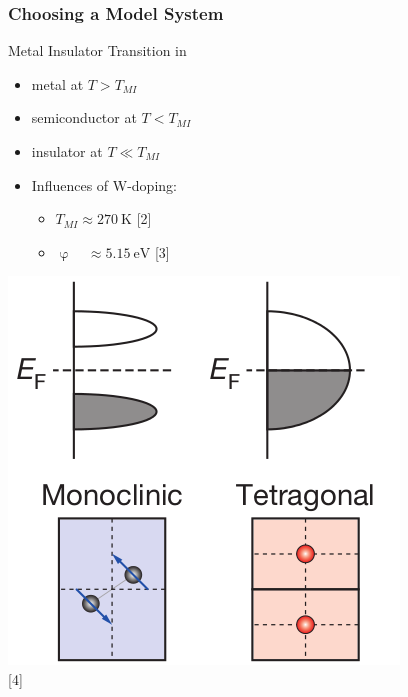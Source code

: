 \documentclass{beamer}
\begin{document}
\begin{frame}
\frametitle{Choosing a Model System}
\begin{block}{Metal Insulator Transition in \vadiox{}}
\begin{minipage}{0.5\linewidth}
	\begin{itemize}
		\item metal at $T>T_{MI}$
		\item semiconductor at $T<T_{MI}$
		\item insulator at $T \ll T_{MI}$
		\item Influences of W-doping:
		\begin{itemize}
			\item $T_{MI}\approx \SI{270}{\kelvin}$ \hspace{0.15cm} \textcolor{RUred}{[2]}
			\item $\upvarphi \phantom{_{MI}} \approx  \SI{5.15}{\electronvolt}$ \textcolor{RUred}{[3]}
		\end{itemize}
	\end{itemize}
\end{minipage}
\hfill
\begin{minipage}{0.45\linewidth}
\centering
	\includegraphics[width=1\linewidth]{./figs/pres/vo2gapopening}\\
	\textcolor{RUred}{[4]}
\end{minipage}
\end{block}\end{frame}
\end{document}
